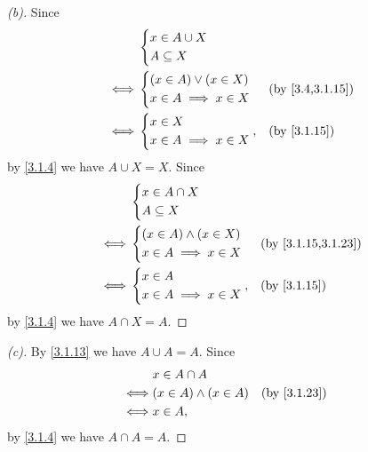 \begin{proof}[(b)]
  Since
  \begin{align*}
         & \begin{dcases}
             x \in A \cup X \\
             A \subseteq X
           \end{dcases}                    \\
    \iff & \begin{dcases}
             (x \in A) \lor (x \in X) \\
             x \in A \implies x \in X
           \end{dcases} &  & \by{3.4,3.1.15} \\
    \iff & \begin{dcases}
             x \in X \\
             x \in A \implies x \in X
           \end{dcases},    &  & \by{3.1.15}
  \end{align*}
  by \cref{3.1.4} we have \(A \cup X = X\).
  Since
  \begin{align*}
         & \begin{dcases}
             x \in A \cap X \\
             A \subseteq X
           \end{dcases}                       \\
    \iff & \begin{dcases}
             (x \in A) \land (x \in X) \\
             x \in A \implies x \in X
           \end{dcases} &  & \by{3.1.15,3.1.23} \\
    \iff & \begin{dcases}
             x \in A \\
             x \in A \implies x \in X
           \end{dcases},     &  & \by{3.1.15}
  \end{align*}
  by \cref{3.1.4} we have \(A \cap X = A\).
\end{proof}

\begin{proof}[(c)]
  By \cref{3.1.13} we have \(A \cup A = A\).
  Since
  \begin{align*}
         & x \in A \cap A                             \\
    \iff & (x \in A) \land (x \in A) &  & \by{3.1.23} \\
    \iff & x \in A,
  \end{align*}
  by \cref{3.1.4} we have \(A \cap A = A\).
\end{proof}

